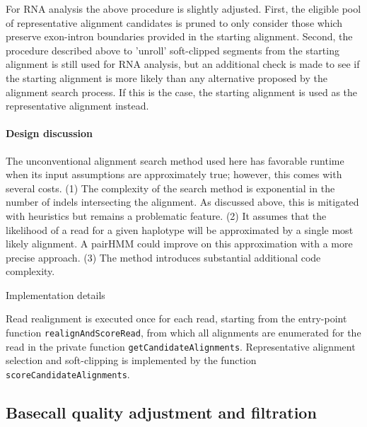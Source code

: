 \documentclass{article}
\let\IncludeDevelopmentDetail
\newenvironment{raggedParagraph}[1]
{
    \begin{paragraph} {#1}
        \raggedright
    }
    {
    \end{paragraph}
}
\begin{document}
For RNA analysis the above procedure is slightly adjusted. First, the eligible pool of representative alignment candidates is pruned to only consider those which preserve exon-intron boundaries provided in the starting alignment. Second, the procedure described above to 'unroll' soft-clipped segments from the starting alignment is still used for RNA analysis, but an additional check is made to see if the starting alignment is more likely than any alternative proposed by the alignment search process. If this is the case, the starting alignment is used as the representative alignment instead.

\ifx\IncludeDevelopmentDetail

\paragraph{Design discussion}

The unconventional alignment search method used here has favorable runtime when its input assumptions are approximately true; however, this comes with several costs. (1) The complexity of the search method is exponential in the number of indels intersecting the alignment. As discussed above, this is mitigated with heuristics but remains a problematic feature. (2) It assumes that the likelihood of a read for a given haplotype will be approximated by a single most likely alignment. A pairHMM could improve on this approximation with a more precise approach. (3) The method introduces substantial additional code complexity.

\begin{raggedParagraph}{Implementation details}

Read realignment is executed once for each read, starting from the entry-point function \verb|realignAndScoreRead|, from which all alignments are enumerated for the read in the private function \verb|getCandidateAlignments|. Representative alignment selection and soft-clipping is implemented by the function \verb|scoreCandidateAlignments|.

\end{raggedParagraph}

\fi %

\subsection{Basecall quality adjustment and filtration}
\end{document}

